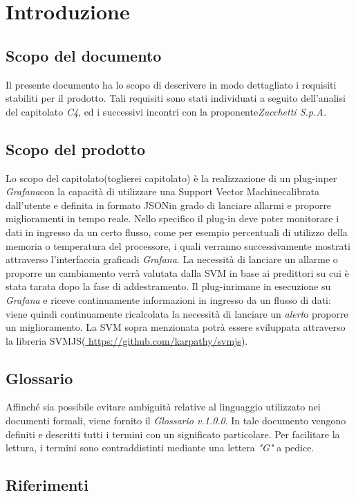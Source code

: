 \section{Introduzione}
	\subsection{Scopo del documento}
		Il presente documento ha lo scopo di descrivere in modo dettagliato i requisiti stabiliti per il prodotto. Tali requisiti sono stati individuati a seguito dell'analisi del capitolato \emph{C4}, ed i successivi incontri con la proponente\glo \emph{Zucchetti S.p.A.}

	
\subsection{Scopo del prodotto}
   Lo scopo del capitolato(toglierei capitolato) è la realizzazione di un plug-in\glo per \emph{Grafana}\glo con la capacità di utilizzare una Support Vector Machine\glo calibrata dall'utente e definita in formato JSON\glo in grado di lanciare allarmi e proporre miglioramenti in tempo reale\glo.
Nello specifico il plug-in deve poter monitorare i dati in ingresso da un certo flusso, come per esempio percentuali di utilizzo della memoria o temperatura del processore, i quali verranno successivamente mostrati attraverso l'interfaccia grafica\glo di \emph{Grafana}.
La necessità di lanciare un allarme o proporre un cambiamento verrà valutata dalla SVM in base ai predittori su cui è stata tarata dopo la fase di addestramento.
Il plug-in\glo rimane in esecuzione su \emph{Grafana} e riceve continuamente informazioni in ingresso da un flusso di dati: viene quindi continuamente ricalcolata la necessità di lanciare un \emph{alert}\glo o proporre un miglioramento.
La SVM sopra menzionata potrà essere sviluppata attraverso la libreria SVMJS\glo (\url{ https://github.com/karpathy/svmjs}).
	
	\subsection{Glossario}
		Affinché sia possibile evitare ambiguità relative al linguaggio utilizzato nei documenti formali, viene fornito il \emph{Glossario v.1.0.0}. In tale documento vengono definiti e descritti tutti i termini con un significato particolare. Per facilitare la lettura, i termini sono contraddistinti mediante una lettera \emph{"G"} a pedice.
		
	\subsection{Riferimenti}
